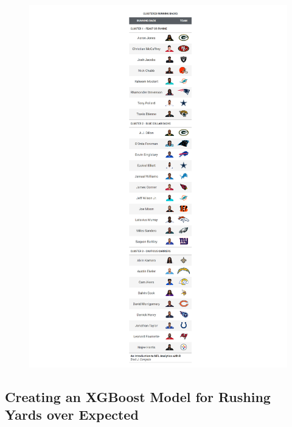 \documentclass[
  letterpaper,
]{krantz}
\begin{document}
\begin{figure}

{\centering \includegraphics[width=6in,height=\textheight]{images/rushers_tables.png}

}

\end{figure}

\hypertarget{creating-an-xgboost-model-for-rushing-yards-over-expected}{%
\subsection{Creating an XGBoost Model for Rushing Yards over
Expected}\label{creating-an-xgboost-model-for-rushing-yards-over-expected}}
\end{document}
